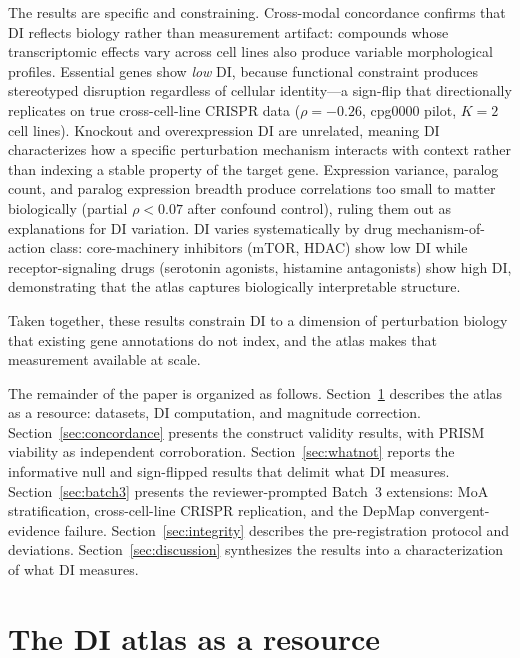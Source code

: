 \documentclass[11pt]{article}
\begin{document}
The results are specific and constraining.  Cross-modal concordance confirms
that DI reflects biology rather than measurement artifact: compounds
whose transcriptomic effects vary across cell lines also produce
variable morphological profiles.  Essential genes show \emph{low} DI, because functional
constraint produces stereotyped disruption regardless of cellular
identity---a sign-flip that directionally replicates on true
cross-cell-line CRISPR data ($\rho = -0.26$, cpg0000 pilot, $K = 2$
cell lines).  Knockout and overexpression DI are unrelated, meaning DI
characterizes how a specific perturbation mechanism interacts with
context rather than indexing a stable property of the target gene.
Expression variance, paralog count, and paralog expression breadth
produce correlations too small to matter biologically (partial
$\rho < 0.07$ after confound control), ruling them out as explanations
for DI variation.  DI varies systematically by drug mechanism-of-action
class: core-machinery inhibitors (mTOR, HDAC) show low DI while
receptor-signaling drugs (serotonin agonists, histamine antagonists)
show high DI, demonstrating that the atlas captures biologically
interpretable structure.

Taken together, these results constrain DI to a dimension of
perturbation biology that existing gene annotations do not index, and
the atlas makes that measurement available at scale.

The remainder of the paper is organized as follows.
Section~\ref{sec:atlas} describes the atlas as a resource: datasets,
DI computation, and magnitude correction.
Section~\ref{sec:concordance} presents the construct validity results,
with PRISM viability as independent corroboration.
Section~\ref{sec:whatnot} reports the informative null and sign-flipped
results that delimit what DI measures.
Section~\ref{sec:batch3} presents the reviewer-prompted Batch~3
extensions: MoA stratification, cross-cell-line CRISPR replication,
and the DepMap convergent-evidence failure.
Section~\ref{sec:integrity} describes the pre-registration protocol and
deviations.
Section~\ref{sec:discussion} synthesizes the results into a
characterization of what DI measures.


\section{The DI atlas as a resource}
\label{sec:atlas}
\end{document}
